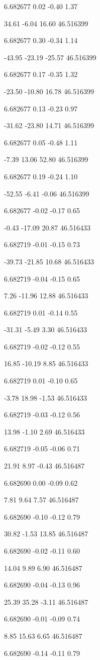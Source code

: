 6.682677
0.02
-0.40
1.37

34.61
-6.04
16.60
46.516399

6.682677
0.30
-0.34
1.14

-43.95
-23.19
-25.57
46.516399

6.682677
0.17
-0.35
1.32

-23.50
-10.80
16.78
46.516399

6.682677
0.13
-0.23
0.97

-31.62
-23.80
14.71
46.516399

6.682677
0.05
-0.48
1.11

-7.39
13.06
52.80
46.516399

6.682677
0.19
-0.24
1.10

-52.55
-6.41
-0.06
46.516399

6.682677
-0.02
-0.17
0.65

-0.43
-17.09
20.87
46.516433

6.682719
-0.01
-0.15
0.73

-39.73
-21.85
10.68
46.516433

6.682719
-0.04
-0.15
0.65

7.26
-11.96
12.88
46.516433

6.682719
0.01
-0.14
0.55

-31.31
-5.49
3.30
46.516433

6.682719
-0.02
-0.12
0.55

16.85
-10.19
8.85
46.516433

6.682719
0.01
-0.10
0.65

-3.78
18.98
-1.53
46.516433

6.682719
-0.03
-0.12
0.56

13.98
-1.10
2.69
46.516433

6.682719
-0.05
-0.06
0.71

21.91
8.97
-0.43
46.516487

6.682690
0.00
-0.09
0.62

7.81
9.64
7.57
46.516487

6.682690
-0.10
-0.12
0.79

30.82
-1.53
13.85
46.516487

6.682690
-0.02
-0.11
0.60

14.04
9.89
6.90
46.516487

6.682690
-0.04
-0.13
0.96

25.39
35.28
-3.11
46.516487

6.682690
-0.01
-0.09
0.74

8.85
15.63
6.65
46.516487

6.682690
-0.14
-0.11
0.79

